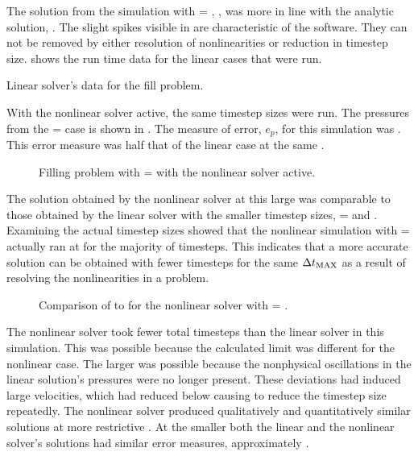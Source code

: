 The solution from the simulation with \dtmax{} = , , was more in line with the analytic solution, .
The slight spikes visible in  are characteristic of the \cobra{} software.
They can not be removed by either resolution of nonlinearities or reduction in timestep size.
 shows the run time data for the linear cases that were run.

\begin{table}[h!tb]
\centering
\singlespace

\caption{Linear solver's data for the fill problem.}
\label{tab:vmpLinRunTime}
\end{table}

With the nonlinear solver active, the same timestep sizes were run.
The pressures from the \dtmax{} =  case is shown in .
The measure of error, $e_{p}$, for this simulation was .
This error measure was half that of the linear case at the same \dtmax{}.

\begin{figure}[h!tb]
\centering

\caption{Filling problem with \dtmax{} =  with the nonlinear solver active.}
\label{fig:nlnFill1em1}
\end{figure}

The solution obtained by the nonlinear solver at this large \dtmax{} was comparable to those obtained by the linear solver with the smaller timestep sizes, \dtmax{} =  and .
Examining the actual timestep sizes showed that the nonlinear simulation with \dtmax{} =  actually ran at \dtmax{} for the majority of timesteps.
This indicates that a more accurate solution can be obtained with fewer timesteps for the same $\dtmax{}$ as a result of resolving the nonlinearities in a problem. 

\begin{figure}[h!tb]
\centering

\caption{Comparison of \dt{} to \dtcrnt{} for the nonlinear solver with \dtmax{} = .}
\label{fig:vmpDeltaTNln1em1}
\end{figure}

The nonlinear solver took fewer total timesteps than the linear solver in this simulation.
This was possible because the calculated \dtcrnt{} limit was different for the nonlinear case.
The larger \dtcrnt{} was possible because the nonphysical oscillations in the linear solution's pressures were no longer present.
These deviations had induced large velocities, which had reduced \dtcrnt{} below \dtmax{} causing \cobra{} to reduce the timestep size repeatedly.
The nonlinear solver produced qualitatively and quantitatively similar solutions at more restrictive \dtmax{}.
At the smaller \dtmax{} both the linear and the nonlinear solver's solutions had similar error measures, approximately .

